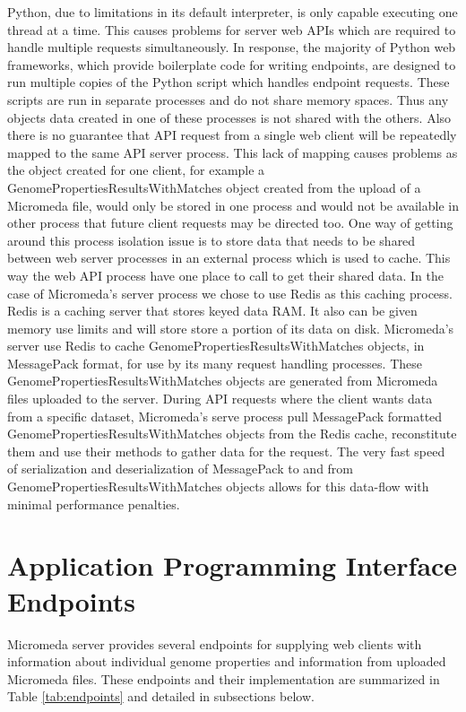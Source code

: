 Python, due to limitations in its default interpreter, is only capable executing one thread at a time. This causes problems for server web APIs which are required to handle multiple requests simultaneously. In response, the majority of Python web frameworks, which provide boilerplate code for writing endpoints, are designed to run multiple copies of the Python script which handles endpoint requests. These scripts are run in separate processes and do not share memory spaces. Thus any objects data created in one of these processes is not shared with the others. Also there is no guarantee that API request from a single web client will be repeatedly mapped to the same API server process. This lack of mapping causes problems as the object created for one client, for example a GenomePropertiesResultsWithMatches object created from the upload of a Micromeda file, would only be stored in one process and would not be available in other process that future client requests may be directed too. One way of getting around this process isolation issue is to store data that needs to be shared between web server processes in an external process which is used to cache. This way the web API process have one place to call to get their shared data. In the case of Micromeda's server process we chose to use Redis as this caching process. Redis is a caching server that stores keyed data RAM. It also can be given memory use limits and will store store a portion of its data on disk. Micromeda's server use Redis to cache GenomePropertiesResultsWithMatches objects, in MessagePack format, for use by its many request handling processes. These GenomePropertiesResultsWithMatches objects are generated from Micromeda files uploaded to the server. During API requests where the client wants data from a specific dataset, Micromeda's serve process pull MessagePack formatted GenomePropertiesResultsWithMatches objects from the Redis cache, reconstitute them and use their methods to gather data for the request. The very fast speed of serialization and deserialization of MessagePack to and from GenomePropertiesResultsWithMatches objects allows for this data-flow with minimal performance penalties.

\section{Application Programming Interface Endpoints} \label{endpoints}

Micromeda server provides several endpoints for supplying web clients with information about individual genome properties and information from uploaded Micromeda files. These endpoints and their implementation are summarized in Table \ref{tab:endpoints} and detailed in subsections below.

